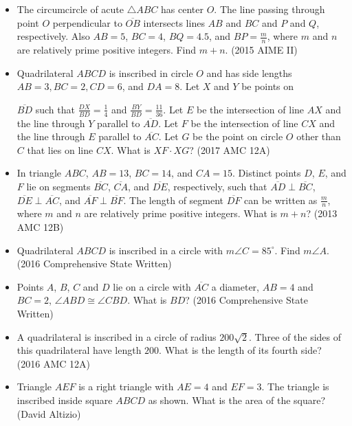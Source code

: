 \documentclass{article}
\begin{document}
\begin{itemize}

\item The circumcircle of acute $\triangle ABC$ has center $O$. The line passing through point $O$ perpendicular to $\overline{OB}$ intersects lines $AB$ and $BC$ and $P$ and $Q$, respectively. Also $AB=5$, $BC=4$, $BQ=4.5$, and $BP=\frac{m}{n}$, where $m$ and $n$ are relatively prime positive integers. Find $m+n$. (2015 AIME II)

\item Quadrilateral $ABCD$ is inscribed in circle $O$ and has side lengths $AB=3, BC=2, CD=6$, and $DA=8$. Let $X$ and $Y$ be points on

$\overline{BD}$ such that $\frac{DX}{BD} = \frac{1}{4}$ and $\frac{BY}{BD} = \frac{11}{36}$. Let $E$ be the intersection of line $AX$ and the line through $Y$ parallel to $\overline{AD}$. Let $F$ be the intersection of line $CX$ and the line through $E$ parallel to $\overline{AC}$. Let $G$ be the point on circle $O$ other than $C$ that lies on line $CX$. What is $XF\cdot XG$? (2017 AMC 12A)

\item In triangle $ABC$, $AB=13$, $BC=14$, and $CA=15$. Distinct points $D$, $E$, and $F$ lie on segments $\overline{BC}$, $\overline{CA}$, and $\overline{DE}$, respectively, such that $\overline{AD}\perp\overline{BC}$, $\overline{DE}\perp\overline{AC}$, and $\overline{AF}\perp\overline{BF}$. The length of segment $\overline{DF}$ can be written as $\frac{m}{n}$, where $m$ and $n$ are relatively prime positive integers. What is $m+n$? (2013 AMC 12B)

\item Quadrilateral $ABCD$ is inscribed in a circle with $m\angle C=85^\circ$. Find $m\angle A$. (2016 Comprehensive State Written)

\item Points $A$, $B$, $C$ and $D$ lie on a circle with $\overline{AC}$ a diameter, $AB=4$ and $BC=2$, $\angle ABD\cong\angle CBD$. What is $BD$? (2016 Comprehensive State Written)

\item A quadrilateral is inscribed in a circle of radius $200\sqrt{2}.$ Three of the sides of this quadrilateral have length $200.$ What is the length of its fourth side? (2016 AMC 12A)

%
\item Triangle $AEF$ is a right triangle with $AE=4$ and $EF=3$. The triangle is inscribed inside square $ABCD$ as shown. What is the area of the square? (David Altizio) 


\end{itemize}
\end{document}
